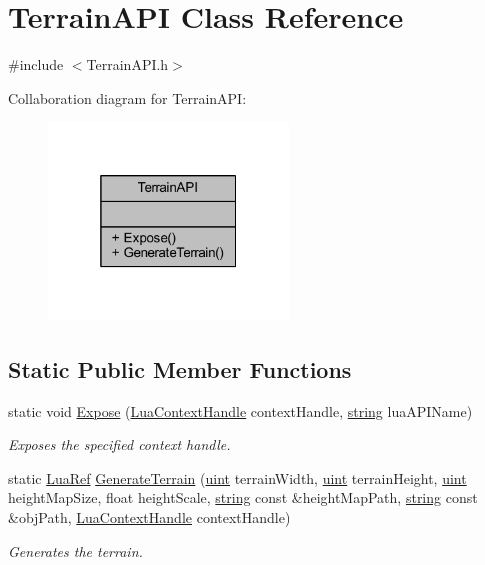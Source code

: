 \hypertarget{class_terrain_a_p_i}{}\section{Terrain\+A\+PI Class Reference}
\label{class_terrain_a_p_i}


{\ttfamily \#include $<$Terrain\+A\+P\+I.\+h$>$}



Collaboration diagram for Terrain\+A\+PI\+:\nopagebreak
\begin{figure}[H]
\begin{center}
\leavevmode
\includegraphics[width=181pt]{class_terrain_a_p_i__coll__graph}
\end{center}
\end{figure}
\subsection*{Static Public Member Functions}
\begin{DoxyCompactItemize}
\item 
static void \hyperlink{class_terrain_a_p_i_ad717b6a69a3658236d7112f906548902}{Expose} (\hyperlink{_lua_context_8h_a2ffcc2d3ed21165072a1d7b61259bf14}{Lua\+Context\+Handle} context\+Handle, \hyperlink{_types_8h_ad453f9f71ce1f9153fb748d6bb25e454}{string} lua\+A\+P\+I\+Name)
\begin{DoxyCompactList}\small\item\em Exposes the specified context handle. \end{DoxyCompactList}\item 
static \hyperlink{_lua_context_8h_a2220f03700ba40e366f0ee2d684d5c91}{Lua\+Ref} \hyperlink{class_terrain_a_p_i_a77f6f3df5ae85964a74eed00b76e1154}{Generate\+Terrain} (\hyperlink{_types_8h_a4f5fce8c1ef282264f9214809524d836}{uint} terrain\+Width, \hyperlink{_types_8h_a4f5fce8c1ef282264f9214809524d836}{uint} terrain\+Height, \hyperlink{_types_8h_a4f5fce8c1ef282264f9214809524d836}{uint} height\+Map\+Size, float height\+Scale, \hyperlink{_types_8h_ad453f9f71ce1f9153fb748d6bb25e454}{string} const \&height\+Map\+Path, \hyperlink{_types_8h_ad453f9f71ce1f9153fb748d6bb25e454}{string} const \&obj\+Path, \hyperlink{_lua_context_8h_a2ffcc2d3ed21165072a1d7b61259bf14}{Lua\+Context\+Handle} context\+Handle)
\begin{DoxyCompactList}\small\item\em Generates the terrain. \end{DoxyCompactList}\end{DoxyCompactItemize}


